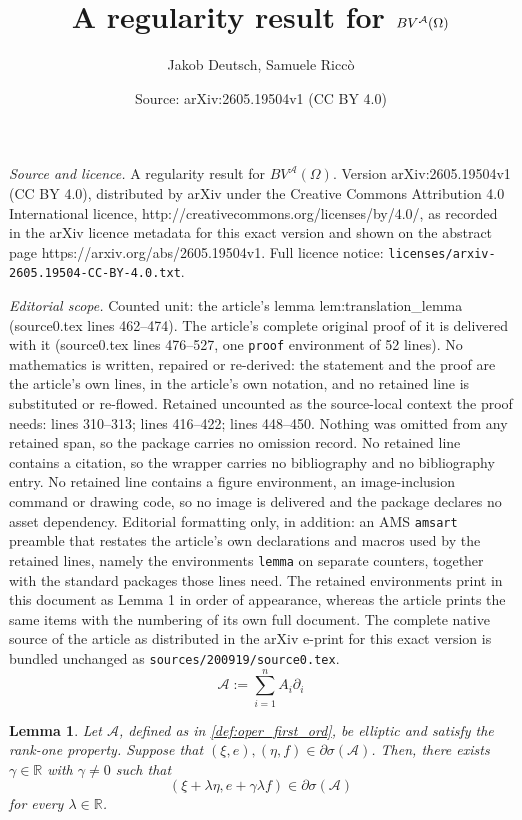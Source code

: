 \documentclass[10pt,a4paper]{amsart}
\title{A regularity result for $BV^{\A}(\Omega)$}
\author{Jakob Deutsch, Samuele Ricc\`o}
\date{Source: arXiv:2605.19504v1 (CC BY 4.0)}
\newtheorem{lemma}{Lemma}
\newcommand{\A}{\mathcal{A}}
\newcommand{\R}{\mathbb{R}}
\begin{document}
\maketitle

\noindent\emph{Source and licence.} A regularity result for $BV^{\A}(\Omega)$. Version arXiv:2605.19504v1 (CC BY 4.0), distributed by arXiv under the Creative Commons Attribution 4.0 International licence, http://creativecommons.org/licenses/by/4.0/, as recorded in the arXiv licence metadata for this exact version and shown on the abstract page https://arxiv.org/abs/2605.19504v1. Full licence notice: \texttt{licenses/arxiv-2605.19504-CC-BY-4.0.txt}.\par\smallskip

\noindent\textit{Editorial scope.} Counted unit: the article's lemma lem:translation\_lemma (source0.tex lines 462--474). The article's complete original proof of it is delivered with it (source0.tex lines 476--527, one \texttt{proof} environment of 52 lines). No mathematics is written, repaired or re-derived: the statement and the proof are the article's own lines, in the article's own notation, and no retained line is substituted or re-flowed.  Retained uncounted as the source-local context the proof needs: lines 310--313; lines 416--422; lines 448--450.  Nothing was omitted from any retained span, so the package carries no omission record.  No retained line contains a citation, so the wrapper carries no bibliography and no bibliography entry.  No retained line contains a figure environment, an image-inclusion command or drawing code, so no image is delivered and the package declares no asset dependency.  Editorial formatting only, in addition: an AMS \texttt{amsart} preamble that restates the article's own declarations and macros used by the retained lines, namely the environments \texttt{lemma} on separate counters, together with the standard packages those lines need.  The retained environments print in this document as Lemma 1 in order of appearance, whereas the article prints the same items with the numbering of its own full document.  The complete native source of the article as distributed in the arXiv e-print for this exact version is bundled unchanged as \texttt{sources/200919/source0.tex}.
\begin{equation}
\label{def:oper_first_ord}
    \A := \sum_{i = 1}^n A_i \partial_i
\end{equation}

\begin{lemma}\label{lem:polarization}
    Let $\A$, defined as in \eqref{def:oper_first_ord}, be elliptic and satisfy the rank-one property. Suppose that $(\xi, e), (\eta, f) \in \partial \sigma(\A)$. Then, there exists $\gamma \in \R$ with $\gamma \neq 0$ such that 
    \[
        (\xi + \lambda \eta, e + \gamma \lambda f) \in \partial \sigma (\A)
    \]
    for every $\lambda \in \R$.
\end{lemma}
\end{document}
